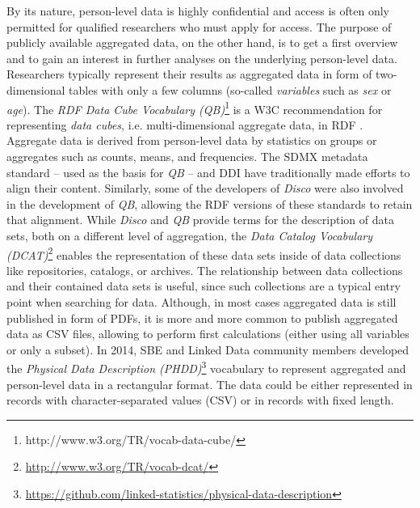 \documentclass{llncs}
\begin{document}
By its nature, person-level data is highly confidential and access is often only permitted for qualified researchers who must apply for access. 
The purpose of publicly available aggregated data, on the other hand, is to get a first overview and to gain an interest in further analyses on the underlying person-level data.
Researchers typically represent their results as aggregated data in form of two-dimensional tables with only a few columns (so-called \emph{variables} such as \emph{sex} or \emph{age}).
The \emph{RDF Data Cube Vocabulary (QB)}\footnote{http://www.w3.org/TR/vocab-data-cube/} is a W3C recommendation for representing \emph{data cubes}, i.e. multi-dimensional aggregate data, in RDF \cite{Cyganiak2010}. 
Aggregate data is derived from person-level data by statistics on groups or aggregates such as counts, means, and frequencies.
The SDMX metadata standard – used as the basis for \emph{QB} – and DDI have traditionally made efforts to align their content. 
Similarly, some of the developers of \emph{Disco} were also involved in the development of \emph{QB}, 
allowing the RDF versions of these standards to retain that alignment.
While \emph{Disco} and \emph{QB} provide terms for the description of data sets, 
both on a different level of aggregation, 
the \emph{Data Catalog Vocabulary (DCAT)}\footnote{\url{http://www.w3.org/TR/vocab-dcat/}} enables the representation of these data sets inside of data collections like repositories, catalogs, or archives. 
The relationship between data collections and their contained data sets is useful, since such collections are a typical entry point when searching for data.
Although, in most cases aggregated data is still published in form of PDFs, 
it is more and more common to publish aggregated data as CSV files,
allowing to perform first calculations (either using all variables or only a subset).
In 2014, SBE and Linked Data community members developed the \emph{Physical Data Description (PHDD)}\footnote{\url{https://github.com/linked-statistics/physical-data-description}} vocabulary to represent aggregated and person-level data in a rectangular format. 
The data could be either represented in records with character-separated values (CSV) or in records with fixed length. 
\end{document}
